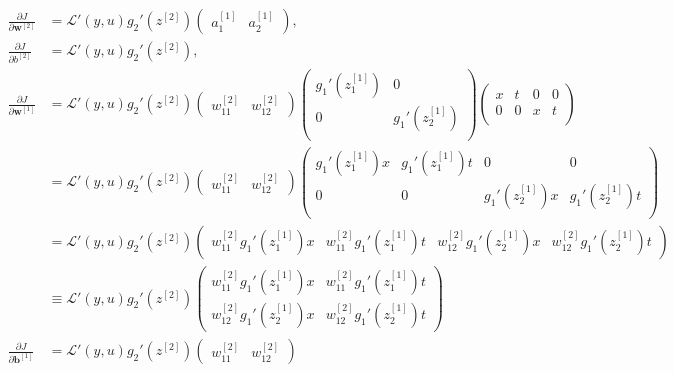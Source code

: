 \documentclass{article}
\begin{document}
\begin{align}
\label{dJdw2mat}
\frac{\partial J}{\partial \textbf{w}^{[2]}} &= 
\mathcal{L}'(y,u)
g_2'(z^{[2]})
\begin{pmatrix}
a_1^{[1]} & a_2^{[1]} 
\end{pmatrix}, \\
\frac{\partial J}{\partial b^{[2]}} &=
\mathcal{L}'(y,u)
g_2'(z^{[2]}),\\
\frac{\partial J}{\partial \textbf{w}^{[1]}} &= 
\mathcal{L}'(y,u)
g_2'(z^{[2]}) 
\begin{pmatrix}
w_{11}^{[2]} & w_{12}^{[2]} 
\end{pmatrix}
\begin{pmatrix}
g_1'(z_1^{[1]}) & 0 \\
0 & g_1'(z_2^{[1]}) \\
\end{pmatrix}
\begin{pmatrix}
x & t & 0 & 0 \\
0 & 0 & x & t \\
\end{pmatrix} \nonumber \\ 
&= 
\mathcal{L}'(y,u)
g_2'(z^{[2]}) 
\begin{pmatrix}
w_{11}^{[2]} & w_{12}^{[2]} 
\end{pmatrix}
\begin{pmatrix}
 g_1'(z_1^{[1]}) x &  g_1'(z_1^{[1]}) t & 0 & 0 \\
0 & 0 &  g_1'(z_2^{[1]}) x & g_1'(z_2^{[1]}) t \\
\end{pmatrix} \nonumber \\ 
&= 
\mathcal{L}'(y,u)
g_2'(z^{[2]}) 
\begin{pmatrix}
w_{11}^{[2]}  g_1'(z_1^{[1]}) x & w_{11}^{[2]} g_1'(z_1^{[1]}) t & w_{12}^{[2]} g_1'(z_2^{[1]}) x &  w_{12}^{[2]} g_1'(z_2^{[1]}) t
\end{pmatrix} \nonumber \\ 
&\equiv 
\mathcal{L}'(y,u)
g_2'(z^{[2]}) 
\begin{pmatrix}
w_{11}^{[2]}  g_1'(z_1^{[1]}) x & w_{11}^{[2]} g_1'(z_1^{[1]}) t \\ w_{12}^{[2]} g_1'(z_2^{[1]}) x &  w_{12}^{[2]} g_1'(z_2^{[1]}) t
\end{pmatrix}
\label{dJdw1mat}
\\ 
\frac{\partial J}{\partial \textbf{b}^{[1]}} &= 
\mathcal{L}'(y,u)
g_2'(z^{[2]}) 
\begin{pmatrix}
w_{11}^{[2]} & w_{12}^{[2]} 
\end{pmatrix}

\end{align}
\end{document}
